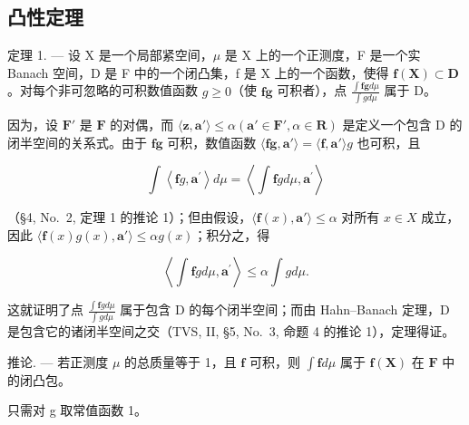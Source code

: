 \subsection{凸性定理}

定理 1. --- 设 X 是一个局部紧空间，\(\mu\) 是 X 上的一个正测度，F 是一个实 Banach 空间，D 是 F 中的一个闭凸集，f 是 X 上的一个函数，使得 \(\mathbf{f}(\mathbf{X}) \subset \mathbf{D}\) 。对每个非可忽略的可积数值函数 \(g \geqslant 0\)（使 \(\mathbf{fg}\) 可积者），点 \(\frac{\int \mathbf{fg} d\mu}{\int g d\mu}\) 属于 D。

因为，设 \(\mathbf{F}'\) 是 \(\mathbf{F}\) 的对偶，而 \(\langle \mathbf{z},\mathbf{a}'\rangle \leqslant \alpha (\mathbf{a}'\in \mathbf{F}',\alpha \in \mathbf{R})\) 是定义一个包含 D 的闭半空间的关系式。由于 \(\mathbf{fg}\) 可积，数值函数 \(\langle \mathbf{fg},\mathbf{a}'\rangle = \langle \mathbf{f},\mathbf{a}'\rangle g\) 也可积，且

\[
\int \left\langle \mathbf {f} g, \mathbf {a} ^ {\prime} \right\rangle d \mu = \left\langle \int \mathbf {f} g d \mu , \mathbf {a} ^ {\prime} \right\rangle
\]

（§4, No.~2, 定理 1 的推论 1）；但由假设，\(\langle \mathbf{f}(x), \mathbf{a}' \rangle \leqslant \alpha\) 对所有 \(x \in X\) 成立，因此 \(\langle \mathbf{f}(x)g(x), \mathbf{a}' \rangle \leqslant \alpha g(x)\)；积分之，得

\[
\left\langle \int \mathbf {f} g d \mu , \mathbf {a} ^ {\prime} \right\rangle \leqslant \alpha \int g d \mu .
\]

这就证明了点 \(\frac{\int\mathbf{f}g d\mu}{\int g d\mu}\) 属于包含 D 的每个闭半空间；而由 Hahn--Banach 定理，D 是包含它的诸闭半空间之交（TVS, II, §5, No.~3, 命题 4 的推论 1），定理得证。

推论. --- 若正测度 \(\mu\) 的总质量等于 1，且 \(\mathbf{f}\) 可积，则 \(\int \mathbf{f} d\mu\) 属于 \(\mathbf{f}(\mathbf{X})\) 在 \(\mathbf{F}\) 中的闭凸包。

只需对 g 取常值函数 1。


